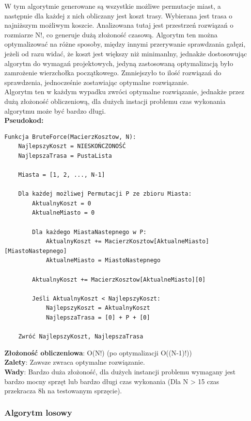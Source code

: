 \documentclass[a4paper,12pt]{article}
\begin{document}
W tym algorytmie generowane są wszystkie możliwe permutacje miast, a następnie dla każdej z nich
obliczany jest koszt trasy. Wybierana jest trasa o najniższym możliwym koszcie. 
Analizowana tutaj jest przestrzeń rozwiązań o rozmiarze N!, co generuje dużą złożoność czasową.
Algorytm ten można optymalizować na różne sposoby, między innymi przerywanie sprawdzania gałęzi, jeżeli od razu widać, że koszt jest większy niż minimanlny,
jednakże dostosowując algorytm do wymagań projektowych, jedyną zastosowaną optymalizacją było zamrożenie wierzchołka początkowego.
Zmniejszyło to ilość rozwiązań do sprawdzenia, jednocześnie zostawiając optymalne rozwiązanie.\\
Algorytm ten w każdym wypadku zwróci optymalne rozwiązanie, jednakże przez dużą złożoność obliczeniową, dla dużych instacji problemu czas wykonania algorytmu może być bardzo długi. \\
\textbf{Pseudokod:} \\
\begin{verbatim}
Funkcja BruteForce(MacierzKosztow, N):
    NajlepszyKoszt = NIESKOŃCZONOŚĆ
    NajlepszaTrasa = PustaLista
    
    Miasta = [1, 2, ..., N-1] 
    
    Dla każdej możliwej Permutacji P ze zbioru Miasta:
        AktualnyKoszt = 0
        AktualneMiasto = 0 
        
        Dla każdego MiastaNastepnego w P:
            AktualnyKoszt += MacierzKosztow[AktualneMiasto][MiastoNastepnego]
            AktualneMiasto = MiastoNastepnego
            
        AktualnyKoszt += MacierzKosztow[AktualneMiasto][0]
        
        Jeśli AktualnyKoszt < NajlepszyKoszt:
            NajlepszyKoszt = AktualnyKoszt
            NajlepszaTrasa = [0] + P + [0]
            
    Zwróć NajlepszyKoszt, NajlepszaTrasa
\end{verbatim}
\textbf{Złożoność obliczeniowa}: O(N!) (po optymalizacji O((N-1)!)) \\
\textbf{Zalety}: Zawsze zwraca optymalne rozwiązanie. \\
\textbf{Wady}: Bardzo duża złożoność, dla dużych instancji problemu wymagany jest bardzo mocny sprzęt lub bardzo długi czas wykonania (Dla N > 15 czas przekracza 8h na testowanym sprzęcie).

\subsubsection{Algorytm losowy}
\end{document}
